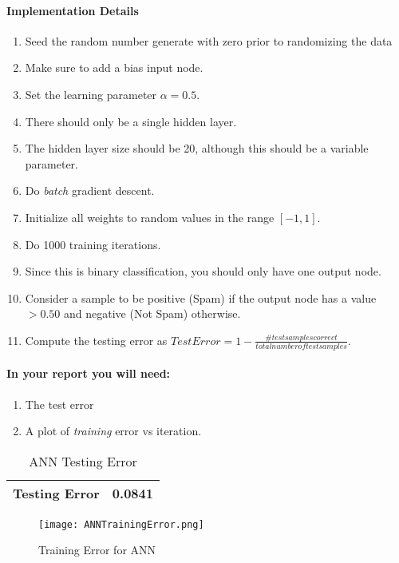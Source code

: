 \documentclass[12pt]{article}
\begin{document}
\paragraph{Implementation Details}
\begin{enumerate}
\item Seed the random number generate with zero prior to randomizing the data
\item Make sure to add a bias input node.
\item Set the learning parameter $\alpha=0.5$.
\item There should only be a single hidden layer.
\item The hidden layer size should be 20, although this should be a variable parameter.
\item Do \emph{batch} gradient descent.
\item Initialize all weights to random values in the range $[-1,1]$.
\item Do 1000 training iterations.
\item Since this is binary classification, you should only have one output node.
\item Consider a sample to be positive (Spam) if the output node has a value $>0.50$ and negative (Not Spam) otherwise.
\item Compute the testing error as $TestError=1-\frac{\#test samples correct}{total number of test samples}$.
\end{enumerate}


\paragraph{In your report you will need:}
\begin{enumerate}
\item The test error
\item A plot of \emph{training} error vs iteration.
\end{enumerate}

\begin{table}[h]
\begin{center}
\begin{tabular}{|l|l|}
\hline
Testing Error & 0.0841\\
\hline
\end{tabular}
\caption{ANN Testing Error}
\end{center}
\end{table}


\begin{figure}[H]
\begin{center}
\texttt{[image: ANNTrainingError.png]}
\caption{Training Error for ANN}
\end{center}
\end{figure}
\end{document}
